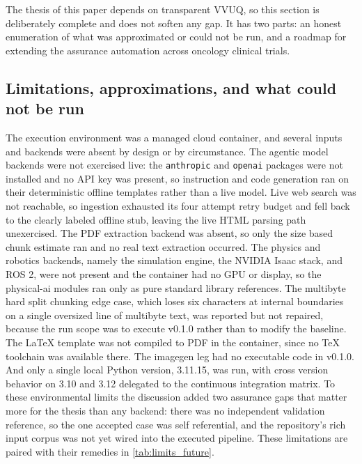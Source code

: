 
The thesis of this paper depends on transparent VVUQ, so this section is
deliberately complete and does not soften any gap. It has two parts: an honest
enumeration of what was approximated or could not be run, and a roadmap for
extending the assurance automation across oncology clinical trials.

\subsection{Limitations, approximations, and what could not be run}

The execution environment was a managed cloud container, and several inputs and
backends were absent by design or by circumstance. The agentic model backends
were not exercised live: the \texttt{anthropic} and \texttt{openai} packages
were not installed and no API key was present, so instruction and code generation
ran on their deterministic offline templates rather than a live model. Live web
search was not reachable, so ingestion exhausted its four attempt retry budget
and fell back to the clearly labeled offline stub, leaving the live HTML parsing
path unexercised. The PDF extraction backend was absent, so only the size based
chunk estimate ran and no real text extraction occurred. The physics and robotics
backends, namely the simulation engine, the NVIDIA Isaac stack, and ROS 2, were
not present and the container had no GPU or display, so the physical-ai modules
ran only as pure standard library references. The multibyte hard split chunking
edge case, which loses six characters at internal boundaries on a single
oversized line of multibyte text, was reported but not repaired, because the run
scope was to execute v0.1.0 rather than to modify the baseline. The LaTeX
template was not compiled to PDF in the container, since no TeX toolchain was
available there. The imagegen leg had no executable code in v0.1.0. And only a
single local Python version, 3.11.15, was run, with cross version behavior on
3.10 and 3.12 delegated to the continuous integration matrix. To these
environmental limits the discussion added two assurance gaps that matter more for
the thesis than any backend: there was no independent validation reference, so
the one accepted case was self referential, and the repository's rich input
corpus was not yet wired into the executed pipeline. These limitations are paired
with their remedies in \autoref{tab:limits_future}.

